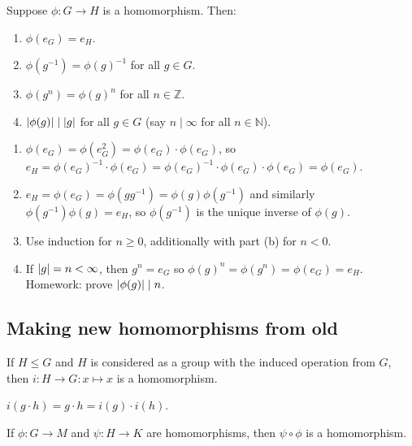 \documentclass[12pt,letterpaper]{report}
\begin{document}
\begin{lem}{}{}
  Suppose $\phi \colon G \to H$ is a homomorphism.
  Then:
  \begin{enumerate}
    \item $\phi(e_G) = e_H$.
    \item $\phi(g^{-1}) = \phi(g)^{-1}$ for all $g \in G$.
    \item $\phi(g^n) = \phi(g)^n$ for all $n \in \mathbb{Z}$.
    \item $\lvert\phi(g)\rvert \mid \lvert g\rvert$ for all $g \in G$ (say $n \mid \infty$ for all
    $n \in \mathbb{N}$).
  \end{enumerate}
\end{lem}

\begin{thmproof}
  \begin{enumerate}
    \item
    $\phi(e_G) = \phi(e_G^2) = \phi(e_G) \cdot \phi(e_G)$, so
    $e_H = \phi(e_G)^{-1} \cdot \phi(e_G) = \phi(e_G)^{-1} \cdot \phi(e_G) \cdot \phi(e_G)
      = \phi(e_G)$.
    \item
    $e_H = \phi(e_G) = \phi(gg^{-1}) = \phi(g) \phi(g^{-1})$ and similarly
    $\phi(g^{-1}) \phi(g) = e_H$, so $\phi(g^{-1})$ is the unique inverse of $\phi(g)$.
    \item
    Use induction for $n \geq 0$, additionally with part (b) for $n < 0$.
    \item
    If $\lvert g\rvert = n < \infty$, then $g^n = e_G$ so $\phi(g)^n = \phi(g^n) = \phi(e_G) = e_H$.
    Homework: prove $\lvert\phi(g)\rvert \mid n$.
  \end{enumerate}
\end{thmproof}

\pagebreak
\subsection{Making new homomorphisms from old}

\begin{lem}{}{}
  If $H \leq G$ and $H$ is considered as a group with the induced operation from $G$, then
  $i \colon H \to G : x \mapsto x$ is a homomorphism.
\end{lem}

\begin{thmproof}
  $i(g \cdot h) = g \cdot h = i(g) \cdot i(h)$.
\end{thmproof}

\begin{lem}{}{}
  If $\phi \colon G \to M$ and $\psi \colon H \to K$ are homomorphisms, then $\psi \circ \phi$ is
  a homomorphism.
\end{lem}
\end{document}
